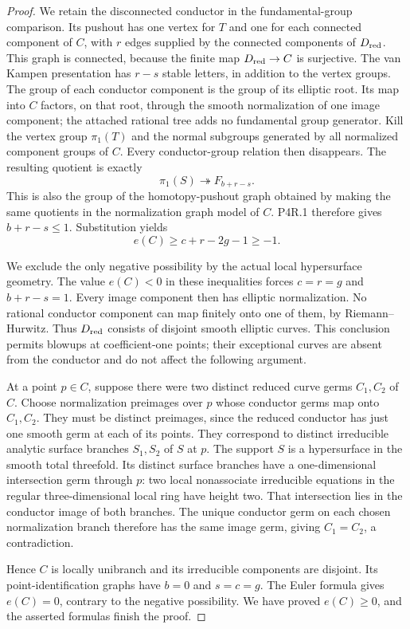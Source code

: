 \begin{proof}
We retain the disconnected conductor in the
fundamental-group comparison. Its pushout has
one vertex for $T$ and one for each connected
component of $C$, with $r$ edges supplied by
the connected components of $D_{\rm red}$.
This graph is connected, because the finite
map $D_{\rm red}\to C$ is surjective.
The van Kampen presentation has $r-s$ stable
letters, in addition to the vertex groups.
The group of each conductor component is the
group of its elliptic root. Its map into $C$
factors, on that root, through the smooth
normalization of one image component; the
attached rational tree adds no fundamental
group generator. Kill the vertex group
$\pi_1(T)$ and the normal subgroups generated
by all normalized component groups of $C$.
Every conductor-group relation then disappears.
The resulting quotient is exactly
\[
 \pi_1(S)\twoheadrightarrow F_{b+r-s}.
\]
This is also the group of the homotopy-pushout
graph obtained by making the same quotients in
the normalization graph model of $C$. P4R.1
therefore gives $b+r-s\le1$. Substitution yields
\[
 e(C)\ge c+r-2g-1\ge-1.
\]

We exclude the only negative possibility by
the actual local hypersurface geometry.
The value $e(C)<0$ in these inequalities
forces $c=r=g$ and $b+r-s=1$. Every image
component then has elliptic normalization.
No rational conductor component can map
finitely onto one of them, by
Riemann--Hurwitz. Thus $D_{\rm red}$ consists
of disjoint smooth elliptic curves. This
conclusion permits blowups at coefficient-one
points; their exceptional curves are absent
from the conductor and do not affect the
following argument.

At a point $p\in C$, suppose there were two
distinct reduced curve germs $C_1,C_2$ of
$C$. Choose normalization preimages over $p$
whose conductor germs map onto $C_1,C_2$.
They must be distinct preimages, since the
reduced conductor has just one smooth germ
at each of its points. They correspond to
distinct irreducible analytic surface
branches $S_1,S_2$ of $S$ at $p$.
The support $S$ is a hypersurface in the
smooth total threefold. Its distinct
surface branches have a one-dimensional
intersection germ through $p$: two local
nonassociate irreducible equations in the
regular three-dimensional local ring have
height two. That intersection lies in the
conductor image of both branches. The
unique conductor germ on each chosen
normalization branch therefore has the
same image germ, giving $C_1=C_2$, a
contradiction.

Hence $C$ is locally unibranch and its
irreducible components are disjoint. Its
point-identification graphs have $b=0$
and $s=c=g$. The Euler formula gives
$e(C)=0$, contrary to the negative
possibility. We have proved $e(C)\ge0$,
and the asserted formulas finish the proof.
\end{proof}


